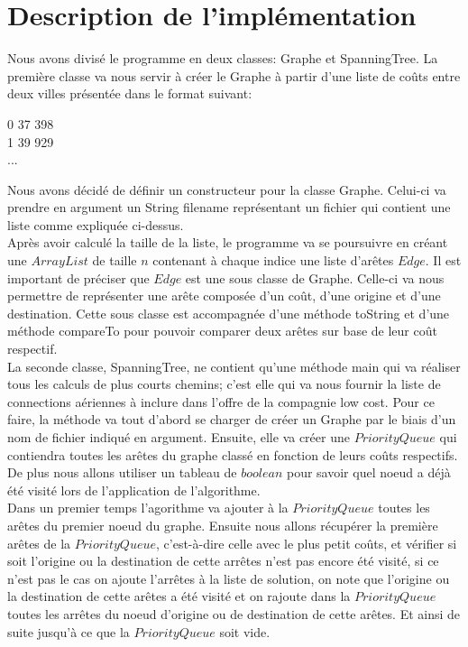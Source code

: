 \documentclass[10pt,a4paper]{article}
\begin{document}
\section*{Description de l'implémentation}
Nous avons divisé le programme en deux classes: Graphe et SpanningTree. La première classe va nous servir à créer le Graphe à partir d'une liste de coûts entre deux villes présentée dans le format suivant:\\

\begin{center}
0 \hspace{1cm} 37 \hspace{1cm} 398\\
1 \hspace{1cm} 39 \hspace{1cm} 929\\
...
\end{center}

Nous avons décidé de définir un constructeur pour la classe Graphe.  Celui-ci va prendre en argument un String filename représentant un fichier qui contient une liste comme expliquée ci-dessus.\\

Après avoir calculé la taille de la liste, le programme va se poursuivre en créant une $ArrayList$ de taille $n$ contenant à chaque indice une liste d'arêtes $Edge$. Il est important de préciser que $Edge$ est une sous classe de Graphe. Celle-ci va nous permettre de représenter une arête composée d'un coût, d'une origine et d'une destination. Cette sous classe est accompagnée d'une méthode toString et d'une méthode compareTo pour pouvoir comparer deux arêtes sur base de leur coût respectif.\\

La seconde classe, SpanningTree, ne contient qu'une méthode main qui va réaliser tous les calculs de plus courts chemins; c'est elle qui va nous fournir la liste de connections aériennes à inclure dans l'offre de la compagnie low cost. Pour ce faire, la méthode va tout d'abord se charger de créer un Graphe par le biais d'un nom de fichier indiqué en argument. Ensuite, elle va créer une $PriorityQueue$ qui contiendra toutes les arêtes du graphe classé en fonction de leurs coûts respectifs. De plus nous allons utiliser un tableau de $boolean$ pour savoir quel noeud a déjà été visité lors de l'application de l'algorithme.\\

Dans un premier temps l'agorithme va ajouter à la $PriorityQueue$ toutes les arêtes du premier noeud du graphe. Ensuite nous allons récupérer la première arêtes de la $PriorityQueue$, c'est-à-dire celle avec le plus petit coûts, et vérifier si soit l'origine ou la destination de cette arrêtes n'est pas encore été visité, si ce n'est pas le cas on ajoute l'arrêtes à la liste de solution, on note que l'origine ou la destination de cette arêtes a été visité et on rajoute dans la $PriorityQueue$ toutes les arrêtes du noeud d'origine ou de destination de cette arêtes. Et ainsi de suite jusqu'à ce que la $PriorityQueue$ soit vide.
\end{document}
